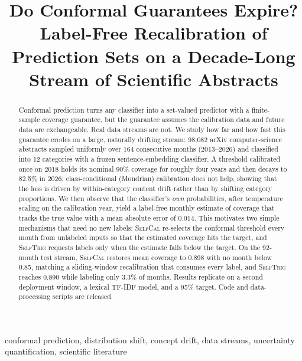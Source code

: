 \documentclass[conference]{IEEEtran}
\newcommand{\selfcal}{\textsc{SelfCal}}
\newcommand{\selftrig}{\textsc{SelfTrig}}
\begin{document}
\title{Do Conformal Guarantees Expire?\\Label-Free Recalibration of Prediction Sets on a Decade-Long Stream of Scientific Abstracts}

\author{
}

\maketitle

\begin{abstract}
Conformal prediction turns any classifier into a set-valued predictor with a finite-sample coverage guarantee, but the guarantee assumes the calibration data and future data are exchangeable. Real data streams are not. We study how far and how fast this guarantee erodes on a large, naturally drifting stream: 98{,}082 arXiv computer-science abstracts sampled uniformly over 164 consecutive months (2013--2026) and classified into 12 categories with a frozen sentence-embedding classifier. A threshold calibrated once on 2018 holds its nominal 90\% coverage for roughly four years and then decays to 82.5\% in 2026; class-conditional (Mondrian) calibration does not help, showing that the loss is driven by within-category content drift rather than by shifting category proportions. We then observe that the classifier's \emph{own} probabilities, after temperature scaling on the calibration year, yield a label-free monthly estimate of coverage that tracks the true value with a mean absolute error of 0.014. This motivates two simple mechanisms that need no new labels: \selfcal{} re-selects the conformal threshold every month from unlabeled inputs so that the estimated coverage hits the target, and \selftrig{} requests labels only when the estimate falls below the target. On the 92-month test stream, \selfcal{} restores mean coverage to 0.898 with no month below 0.85, matching a sliding-window recalibration that consumes every label, and \selftrig{} reaches 0.890 while labeling only 3.3\% of months. Results replicate on a second deployment window, a lexical TF-IDF model, and a 95\% target. Code and data-processing scripts are released.
\end{abstract}

\begin{IEEEkeywords}
conformal prediction, distribution shift, concept drift, data streams, uncertainty quantification, scientific literature
\end{IEEEkeywords}
\end{document}
